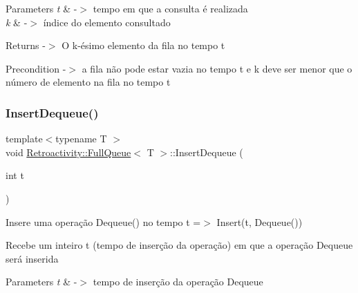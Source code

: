\begin{DoxyParams}{Parameters}
{\em t} & -\/$>$ tempo em que a consulta é realizada \\
\hline
{\em k} & -\/$>$ índice do elemento consultado \\
\hline
\end{DoxyParams}
\begin{DoxyReturn}{Returns}
-\/$>$ O k-\/ésimo elemento da fila no tempo t 
\end{DoxyReturn}
\begin{DoxyPrecond}{Precondition}
-\/$>$ a fila não pode estar vazia no tempo t e k deve ser menor que o número de elemento na fila no tempo t 
\end{DoxyPrecond}
\mbox{\label{classRetroactivity_1_1FullQueue_acbdabeb03cf244b842df59fd64b86592}} 
\subsubsection{\texorpdfstring{Insert\+Dequeue()}{InsertDequeue()}}
{\footnotesize\ttfamily template$<$typename T $>$ \\
void \hyperlink{classRetroactivity_1_1FullQueue}{Retroactivity\+::\+Full\+Queue}$<$ T $>$\+::Insert\+Dequeue (\begin{DoxyParamCaption}\item[{int}]{t }\end{DoxyParamCaption})}

Insere uma operação Dequeue() no tempo t =$>$ Insert(t, Dequeue())

Recebe um inteiro t (tempo de inserção da operação) em que a operação Dequeue será inserida


\begin{DoxyParams}{Parameters}
{\em t} & -\/$>$ tempo de inserção da operação Dequeue \\
\hline
\end{DoxyParams}
\mbox{\label{classRetroactivity_1_1FullQueue_a200afe69110074321a9f2b56ffc2e10f}} 
